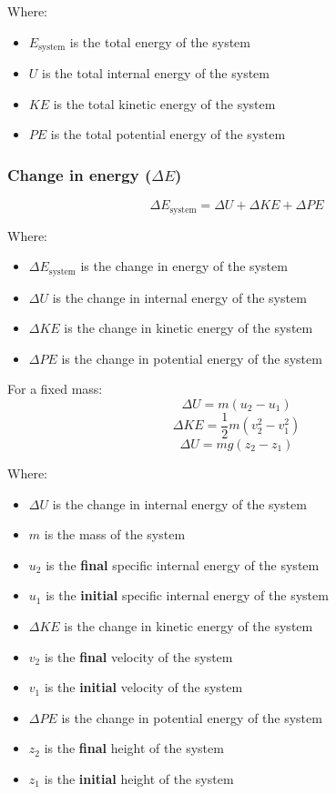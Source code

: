 \documentclass[11pt]{article}
\begin{document}
Where:
\begin{itemize}
\item \(E_{\text{system}}\) is the total energy of the system
\item \(U\) is the total internal energy of the system
\item \(KE\) is the total kinetic energy of the system
\item \(PE\) is the total potential energy of the system
\end{itemize}

\newpage

\subsubsection{Change in energy (\(\Delta E\))}
\label{sec:org52639bd}
\[\Delta E_{\text{system}} = \Delta U + \Delta KE + \Delta PE\]

Where:
\begin{itemize}
\item \(\Delta E_{\text{system}}\) is the change in energy of the system
\item \(\Delta U\) is the change in internal energy of the system
\item \(\Delta KE\) is the change in kinetic energy of the system
\item \(\Delta PE\) is the change in potential energy of the system
\end{itemize}

For a fixed mass:
\[\Delta U = m (u_2 - u_1)\]
\[\Delta KE = \frac{1}{2} m (v_2^2 - v_1^2)\]
\[\Delta U = mg (z_2 - z_1)\]

Where:
\begin{itemize}
\item \(\Delta U\) is the change in internal energy of the system
\item \(m\) is the mass of the system
\item \(u_2\) is the \textbf{final} specific internal energy of the system
\item \(u_1\) is the \textbf{initial} specific internal energy of the system
\item \(\Delta KE\) is the change in kinetic energy of the system
\item \(v_2\) is the \textbf{final} velocity of the system
\item \(v_1\) is the \textbf{initial} velocity of the system
\item \(\Delta PE\) is the change in potential energy of the system
\item \(z_2\) is the \textbf{final} height of the system
\item \(z_1\) is the \textbf{initial} height of the system
\end{itemize}
\end{document}
